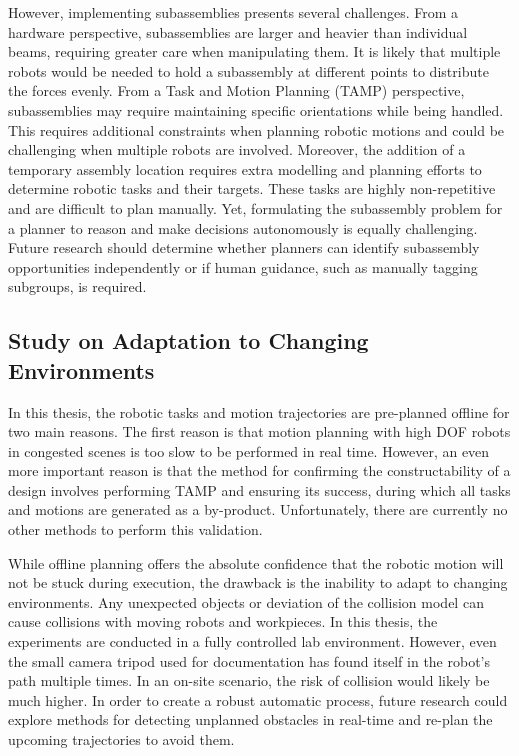 However, implementing subassemblies presents several challenges. From a hardware perspective, subassemblies are larger and heavier than individual beams, requiring greater care when manipulating them. It is likely that multiple robots would be needed to hold a subassembly at different points to distribute the forces evenly. From a Task and Motion Planning (TAMP) perspective, subassemblies may require maintaining specific orientations while being handled. This requires additional constraints when planning robotic motions and could be challenging when multiple robots are involved. Moreover, the addition of a temporary assembly location requires extra modelling and planning efforts to determine robotic tasks and their targets. These tasks are highly non-repetitive and are difficult to plan manually. Yet, formulating the subassembly problem for a planner to reason and make decisions autonomously is equally challenging. Future research should determine whether planners can identify subassembly opportunities independently or if human guidance, such as manually tagging subgroups, is required.

\subsection{Study on Adaptation to Changing Environments}
\label{subsection:study-on-adaptation-to-changing-environments}

In this thesis, the robotic tasks and motion trajectories are pre-planned offline for two main reasons. The first reason is that motion planning with high DOF robots in congested scenes is too slow to be performed in real time. However, an even more important reason is that the method for confirming the constructability of a design involves performing TAMP and ensuring its success, during which all tasks and motions are generated as a by-product. Unfortunately, there are currently no other methods to perform this validation. 

While offline planning offers the absolute confidence that the robotic motion will not be stuck during execution, the drawback is the inability to adapt to changing environments. Any unexpected objects or deviation of the collision model can cause collisions with moving robots and workpieces. In this thesis, the experiments are conducted in a fully controlled lab environment. However, even the small camera tripod used for documentation has found itself in the robot's path multiple times. In an on-site scenario, the risk of collision would likely be much higher. In order to create a robust automatic process, future research could explore methods for detecting unplanned obstacles in real-time and re-plan the upcoming trajectories to avoid them.


